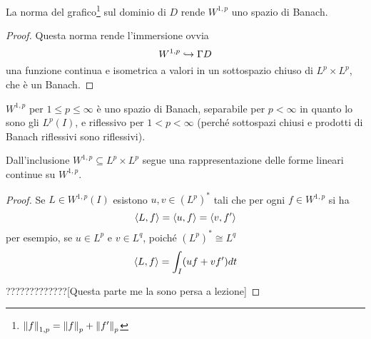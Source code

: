 \begin{corollary}
La norma del grafico\footnote{$\left\Vert{f}\right\Vert_{1,p}=\left\Vert{f}\right\Vert_p+\left\Vert{f'}\right\Vert_p$} sul dominio di $D$ rende $W^{1,p}$ uno spazio di Banach. 
\end{corollary}
\begin{proof}
Questa norma rende l'immersione ovvia
\[W^{1,p}\hookrightarrow \Gamma D\]
una funzione continua e isometrica a valori in un sottospazio chiuso di $L^p\times L^p$, che \`e un Banach.
\end{proof}

\begin{remark}
$W^{1,p}$ per $1\leq p\leq\infty$ \`e uno spazio di Banach, separabile per $p<\infty$ in quanto lo sono gli $L^p(I)$, e riflessivo per $1<p<\infty$ (perch\'e sottospazi chiusi e prodotti di Banach riflessivi sono riflessivi).
\end{remark}

\begin{remark}
Dall'inclusione $W^{1,p}\subseteq L^p\times L^p$ segue una rappresentazione delle forme lineari continue su $W^{1,p}$.
\end{remark}
\begin{proof}
Se $L\in W^{1,p}(I)$ esistono $u,v\in (L^p)^\ast$ tali che per ogni $f\in W^{1,p}$ si ha
\[\left\langle {L,f}\right\rangle=\left\langle {u,f}\right\rangle=\left\langle {v,f'}\right\rangle\]
per esempio, se $u\in L^p$ e $v\in L^q$, poich\'e $(L^p)^\ast\cong L^q$
\[\left\langle {L,f}\right\rangle=\int_I(uf+vf')dt\]


?????????????[Questa parte me la sono persa a lezione]
\end{proof}


